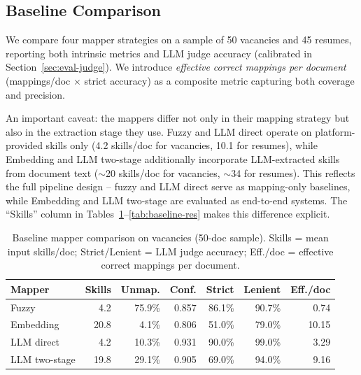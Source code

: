 \documentclass[11pt]{article}
\begin{document}
\subsection{Baseline Comparison}
\label{sec:eval-baseline}

We compare four mapper strategies on a sample of 50 vacancies and 45 resumes, reporting both intrinsic metrics and LLM judge accuracy (calibrated in Section~\ref{sec:eval-judge}). We introduce \emph{effective correct mappings per document} (mappings/doc $\times$ strict accuracy) as a composite metric capturing both coverage and precision.

An important caveat: the mappers differ not only in their mapping strategy but also in the extraction stage they use. Fuzzy and LLM direct operate on platform-provided skills only (4.2 skills/doc for vacancies, 10.1 for resumes), while Embedding and LLM two-stage additionally incorporate LLM-extracted skills from document text ($\sim$20 skills/doc for vacancies, $\sim$34 for resumes). This reflects the full pipeline design -- fuzzy and LLM direct serve as mapping-only baselines, while Embedding and LLM two-stage are evaluated as end-to-end systems. The ``Skills'' column in Tables~\ref{tab:baseline-vac}--\ref{tab:baseline-res} makes this difference explicit.

\begin{table}[h]
  \centering
  \small
  \begin{tabular}{@{}lrrrrrr@{}}
    \toprule
    \textbf{Mapper} & \textbf{Skills} & \textbf{Unmap.} & \textbf{Conf.} & \textbf{Strict} & \textbf{Lenient} & \textbf{Eff./doc} \\
    \midrule
    Fuzzy & 4.2 & 75.9\% & 0.857 & 86.1\% & 90.7\% & 0.74 \\
    Embedding & 20.8 & 4.1\% & 0.806 & 51.0\% & 79.0\% & 10.15 \\
    LLM direct & 4.2 & 10.3\% & 0.931 & 90.0\% & 99.0\% & 3.29 \\
    LLM two-stage & 19.8 & 29.1\% & 0.905 & 69.0\% & 94.0\% & 9.16 \\
    \bottomrule
  \end{tabular}
  \caption{Baseline mapper comparison on vacancies (50-doc sample). Skills = mean input skills/doc; Strict/Lenient = LLM judge accuracy; Eff./doc = effective correct mappings per document.}
  \label{tab:baseline-vac}
\end{table}
\end{document}
